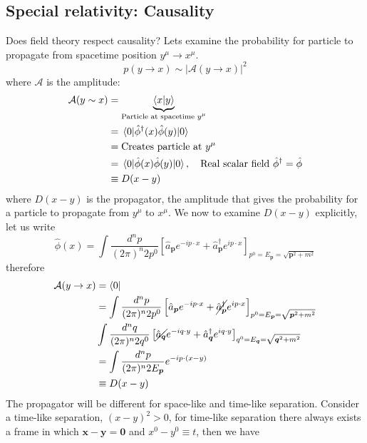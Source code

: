 \subsection{Special relativity: Causality}

Does field theory respect causality? Lets examine the probability for particle to propagate from spacetime position $y^\mu \to x^\mu$. 
\begin{equation}
    p(y \to x) \sim |\mathcal{A}(y \to x)|^2
\end{equation}
where $\mathcal{A}$ is the amplitude: 
\begin{align}
    \mathcal{A} (y \sim x) & = \underbrace{\expval{x|y}}_\text{Particle at spacetime $y^\mu$} \nonumber\\
    & = \mel{0}{\hat{\phi}^{\dagger}(x) \hat{\phi}(y) }{0} \nonumber\\
    & = \text{Creates particle at } y^\mu \nonumber\\
    &= \mel{0}{\hat{\phi}(x)\hat{\phi}(y)}{0}, \quad \text{Real scalar field } \hat{\phi}^\dagger = \hat{\phi} \nonumber\\
    & \equiv D(x - y)
\end{align}
where $D(x -y)$ is the propagator, the amplitude that gives the probability for a particle to propagate from $y^\mu$ to $x^\mu$. We now to examine $D(x -y)$ explicitly, let us write 
\begin{equation}
     \hat{\phi}(x)=  \int \frac{d^n p}{(2\pi)^n 2p^0} \left[\hat{a}_{\bm{p}} e^{-ip\cdot x} +  \hat{a}_{\bm{p}}^{\dagger} e^{ip\cdot x} \right]_{p^0 =  E_{\bm{p}} = \sqrt{\bm{p}^2  + m^2 }   }
\end{equation}
therefore
\begin{align}
  \mathcal{A} (y \to x) & = \bra{0}  \nonumber\\
  & =  \int \frac{d^n p}{(2\pi)^n 2p^0} \left[\hat{a}_{\bm{p}} e^{-ip\cdot x} +  \cancel{\hat{a}_{\bm{p}}^{\dagger}} e^{ip\cdot x} \right]_{p^0 =  E_{\bm{p}} = \sqrt{\bm{p}^2  + m^2 }   } \nonumber\\
  & \int \frac{d^n q}{(2\pi)^n 2q^0} \left[ \cancel{\hat{a}_{\bm{q}}} e^{-iq\cdot y} +  \hat{a}_{\bm{q}}^{\dagger} e^{iq\cdot y} \right]_{q^0 =  E_{\bm{q}} = \sqrt{\bm{q}^2  + m^2 }   } \nonumber\\
  & = \int \frac{d^n p}{(2\pi)^n  2E_{\bm{p}} } e^{-ip \cdot (x - y)} \nonumber\\
  & \equiv D(x - y)
\end{align}
The propagator will be different for space-like and time-like separation. Consider a time-like separation, $(x - y)^2 > 0$, for time-like separation there always exists a frame in which $\bm{x} - \bm{y} = \bm{0}$ and $x^0 - y^0 \equiv t$, then we have
